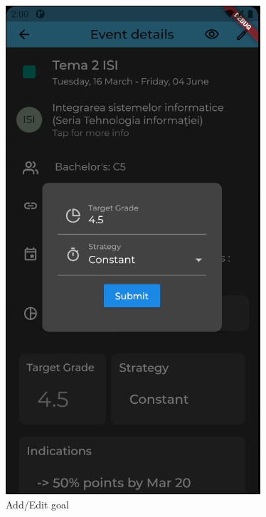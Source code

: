 \begin{figure}[!ht]
    \hfill
    \begin{minipage}[b]{0.35\textwidth}
        \captionsetup{justification=centering}
        \includegraphics[width=\textwidth]{figures/ss/image1.png}
        \caption{Add/Edit goal}
        \label{5:fig:faddgoal}
    \end{minipage}
    
\end{figure}

~